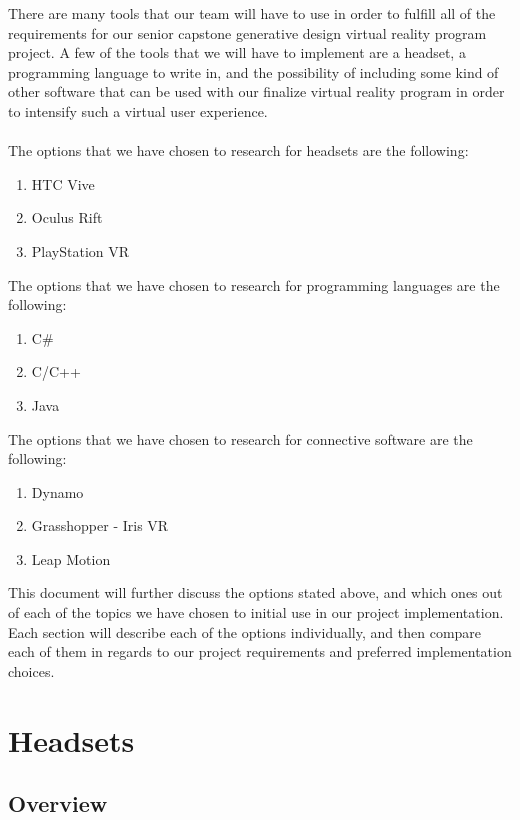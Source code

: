\documentclass[letterpaper,10pt,onecolumn,compsoc]{IEEEtran}
\begin{document}
\noindent
There are many tools that our team will have to use in order to fulfill all of the requirements for our senior capstone generative design virtual reality program project. A few of the tools that we will have to implement are a headset, a programming language to write in, and the possibility of including some kind of other software that can be used with our finalize virtual reality program in order to intensify such a virtual user experience. 
\\ ~ \\
The options that we have chosen to research for headsets are the following:
\begin{enumerate}
 	\item HTC Vive
 	\item Oculus Rift
 	\item PlayStation VR
\end{enumerate}
\noindent
The options that we have chosen to research for programming languages are the following:
\begin{enumerate}
 	\item C\#
 	\item C/C++
 	\item Java
\end{enumerate}
\noindent
The options that we have chosen to research for connective software are the following:
\begin{enumerate}
 	\item Dynamo
 	\item Grasshopper - Iris VR
 	\item Leap Motion
\end{enumerate}
\noindent
This document will further discuss the options stated above, and which ones out of each of the topics we have chosen to initial use in our project implementation. Each section will describe each of the options individually, and then compare each of them in regards to our project requirements and preferred implementation choices.

\newpage

\section{Headsets}
\subsection{Overview}
\end{document}
